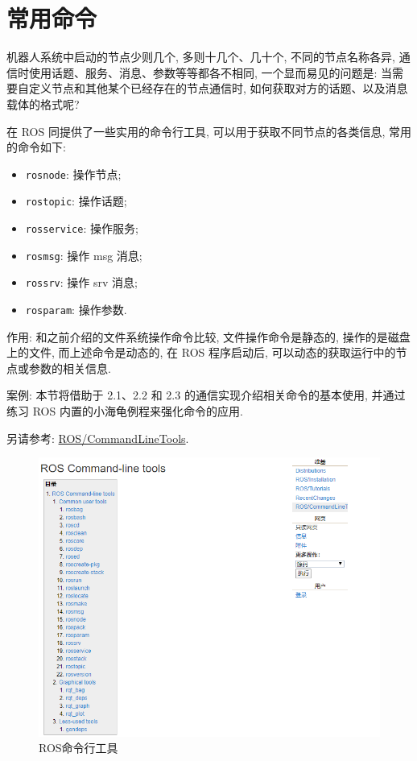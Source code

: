 \documentclass[openany, fontset=windowsold]{ctexbook}
\theoremstyle{kaiti}
\theoremstyle{normal}
\begin{document}
\section{常用命令}

机器人系统中启动的节点少则几个, 多则十几个、几十个, 不同的节点名称各异, 通信时使用话题、服务、消息、参数等等都各不相同, 一个显而易见的问题是: 当需要自定义节点和其他某个已经存在的节点通信时, 如何获取对方的话题、以及消息载体的格式呢? 

在 ROS 同提供了一些实用的命令行工具, 可以用于获取不同节点的各类信息, 常用的命令如下:

\begin{itemize}
  \item \verb|rosnode|: 操作节点;
  \item \verb|rostopic|: 操作话题;
  \item \verb|rosservice|: 操作服务;
  \item \verb|rosmsg|: 操作 msg 消息;
  \item \verb|rossrv|: 操作 srv 消息;
  \item \verb|rosparam|: 操作参数.
\end{itemize}

作用: 和之前介绍的文件系统操作命令比较, 文件操作命令是静态的, 操作的是磁盘上的文件, 而上述命令是动态的, 在 ROS 程序启动后, 可以动态的获取运行中的节点或参数的相关信息.

案例: 本节将借助于 2.1、2.2 和 2.3 的通信实现介绍相关命令的基本使用, 并通过练习 ROS 内置的小海龟例程来强化命令的应用.

另请参考: \href{http://wiki.ros.org/ROS/CommandLineTools}{ROS/CommandLineTools}.

\begin{figure}[!ht]
  \centering
  \includegraphics[width=.8\textwidth]{ros_command_line_tools.png}
  \caption{ROS命令行工具}
  \label{fig:ros_command_line_tools}
\end{figure}
\end{document}
